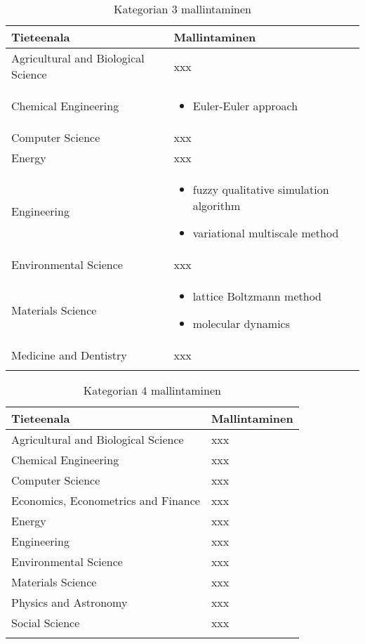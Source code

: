 \documentclass[utf8]{gradu3}
\begin{document}
\begin{longtable}[h]{|p{5cm}|p{8cm}|}
    \hline
    \textbf{Tieteenala}    &    \textbf{Mallintaminen}\\
    \hline
    Agricultural and Biological Science & xxx \\
    \hline
    Chemical Engineering & \begin{itemize}
        \item Euler-Euler approach
    \end{itemize} \\
    \hline
    Computer Science & xxx \\
    \hline
    Energy & xxx \\
    \hline
    Engineering & \begin{itemize}
        \item fuzzy qualitative simulation algorithm
        \item variational multiscale method
    \end{itemize} \\
    \hline
    Environmental Science & xxx \\
    \hline
    Materials Science & \begin{itemize}
        \item lattice Boltzmann method
        \item molecular dynamics
    \end{itemize} \\
    \hline
    Medicine and Dentistry & xxx \\
    \hline
    \caption{Kategorian 3 mallintaminen}
    \label{table:Kategorian 3 mallintaminen}
\end{longtable}

\begin{longtable}[h]{|p{5cm}|p{8cm}|}
    \hline
    \textbf{Tieteenala}    &    \textbf{Mallintaminen}\\
    \hline
    Agricultural and Biological Science & xxx \\
    \hline
    Chemical Engineering & xxx \\
    \hline
    Computer Science & xxx \\
    \hline
    Economics, Econometrics and Finance & xxx \\
    \hline
    Energy & xxx \\
    \hline
    Engineering & xxx \\
    \hline
    Environmental Science & xxx \\
    \hline
    Materials Science & xxx \\
    \hline
    Physics and Astronomy & xxx \\
    \hline
    Social Science & xxx \\
    \hline
    \caption{Kategorian 4 mallintaminen}
    \label{table:Kategorian 4 mallintaminen}
\end{longtable}
\end{document}
